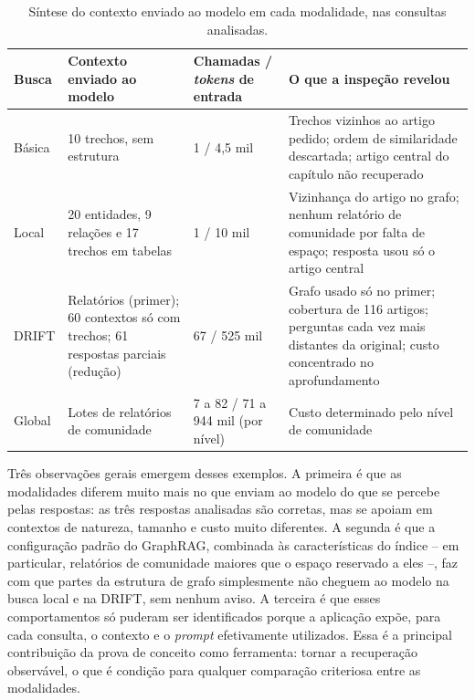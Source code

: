\begin{table}[htb]
\centering
\caption{Síntese do contexto enviado ao modelo em cada modalidade, nas consultas analisadas.}
\label{tab-analise-sintese}
\footnotesize
\begin{tabular}{L{1.5cm} L{4.4cm} L{3.2cm} L{4.8cm}}
\toprule
\textbf{Busca} & \textbf{Contexto enviado ao modelo} & \textbf{Chamadas / \textit{tokens} de entrada} & \textbf{O que a inspeção revelou} \\
\midrule
Básica & 10 trechos, sem estrutura & 1 / 4,5 mil & Trechos vizinhos ao artigo pedido; ordem de similaridade descartada; artigo central do capítulo não recuperado \\
Local & 20 entidades, 9 relações e 17 trechos em tabelas & 1 / 10 mil & Vizinhança do artigo no grafo; nenhum relatório de comunidade por falta de espaço; resposta usou só o artigo central \\
DRIFT & Relatórios (primer); 60 contextos só com trechos; 61 respostas parciais (redução) & 67 / 525 mil & Grafo usado só no primer; cobertura de 116 artigos; perguntas cada vez mais distantes da original; custo concentrado no aprofundamento \\
Global & Lotes de relatórios de comunidade & 7 a 82 / 71 a 944 mil (por nível) & Custo determinado pelo nível de comunidade \\
\bottomrule
\end{tabular}
\end{table}

Três observações gerais emergem desses exemplos. A primeira é que as modalidades diferem muito mais no que enviam ao modelo do que se percebe pelas respostas: as três respostas analisadas são corretas, mas se apoiam em contextos de natureza, tamanho e custo muito diferentes. A segunda é que a configuração padrão do GraphRAG, combinada às características do índice -- em particular, relatórios de comunidade maiores que o espaço reservado a eles --, faz com que partes da estrutura de grafo simplesmente não cheguem ao modelo na busca local e na DRIFT, sem nenhum aviso. A terceira é que esses comportamentos só puderam ser identificados porque a aplicação expõe, para cada consulta, o contexto e o \textit{prompt} efetivamente utilizados. Essa é a principal contribuição da prova de conceito como ferramenta: tornar a recuperação observável, o que é condição para qualquer comparação criteriosa entre as modalidades.
